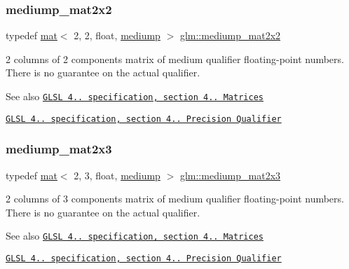 \subsubsection{\texorpdfstring{mediump\+\_\+mat2x2}{mediump\_mat2x2}}
{\footnotesize\ttfamily typedef \hyperlink{structglm_1_1mat}{mat}$<$ 2, 2, float, \hyperlink{namespaceglm_a36ed105b07c7746804d7fdc7cc90ff25a6416f3ea0c9025fb21ed50c4d6620482}{mediump} $>$ \hyperlink{group__core__precision_gaa7581ec892b01e6ba19c4fdbc7c60df4}{glm\+::mediump\+\_\+mat2x2}}

2 columns of 2 components matrix of medium qualifier floating-\/point numbers. There is no guarantee on the actual qualifier.

\begin{DoxySeeAlso}{See also}
\href{http://www.opengl.org/registry/doc/GLSLangSpec.4.20.8.pdf}{\tt G\+L\+SL 4.. specification, section 4.. Matrices} 

\href{http://www.opengl.org/registry/doc/GLSLangSpec.4.20.8.pdf}{\tt G\+L\+SL 4.. specification, section 4.. Precision Qualifier} 
\end{DoxySeeAlso}
\mbox{\label{group__core__precision_gae5003c3cea9aa152bf452223b7fd0fd5}} 
\subsubsection{\texorpdfstring{mediump\+\_\+mat2x3}{mediump\_mat2x3}}
{\footnotesize\ttfamily typedef \hyperlink{structglm_1_1mat}{mat}$<$ 2, 3, float, \hyperlink{namespaceglm_a36ed105b07c7746804d7fdc7cc90ff25a6416f3ea0c9025fb21ed50c4d6620482}{mediump} $>$ \hyperlink{group__core__precision_gae5003c3cea9aa152bf452223b7fd0fd5}{glm\+::mediump\+\_\+mat2x3}}

2 columns of 3 components matrix of medium qualifier floating-\/point numbers. There is no guarantee on the actual qualifier.

\begin{DoxySeeAlso}{See also}
\href{http://www.opengl.org/registry/doc/GLSLangSpec.4.20.8.pdf}{\tt G\+L\+SL 4.. specification, section 4.. Matrices} 

\href{http://www.opengl.org/registry/doc/GLSLangSpec.4.20.8.pdf}{\tt G\+L\+SL 4.. specification, section 4.. Precision Qualifier} 
\end{DoxySeeAlso}
\mbox{\label{group__core__precision_ga9778942a37cd364cc4129cbf423df429}} 
